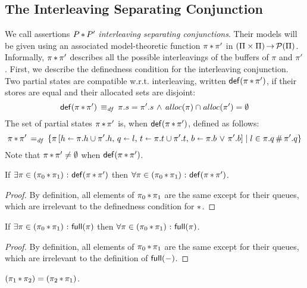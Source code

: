 \documentclass[11pt]{report}
\begin{document}
\subsection{The Interleaving Separating Conjunction}

We call assertions $P \operatorname{\ast} P'$ \emph{interleaving separating conjunctions}. Their models will be given using an associated model-theoretic function $\pi \operatorname{\ast} \pi'$ in $(\Pi \times \Pi) \operatorname{\rightarrow} \mathcal{P}(\Pi)$. Informally, $\pi \operatorname{\ast} \pi'$ describes all the possible interleavings of the buffers of $\pi$ and $\pi'$. First, we describe the definedness condition for the interleaving conjunction. Two partial states are compatible w.r.t. interleaving, written $\mathsf{def}(\pi \operatorname{\ast} \pi')$, if their stores are equal and  their allocated sets are disjoint: \[ \mathsf{def}(\pi \operatorname{\ast} \pi') \operatorname{\;\equiv_{\mathit{df}}\;} \pi.s = \pi'.s \operatorname{\,\wedge\,} \mathit{alloc}(\pi) \cap \mathit{alloc}(\pi') = \operatorname{\emptyset} \]
The set of partial states $\pi \operatorname{\ast} \pi'$ is, when $\mathsf{def}(\pi \operatorname{\ast} \pi')$, defined as follows:\[ 
	\pi \operatorname{\ast} \pi' \operatorname{\;=_{\mathit{df}}\;} \left\lbrace \pi \left[ h \shortleftarrow \pi.h \cup \pi'.h,\,q \shortleftarrow l,\, t \shortleftarrow \pi.t \cup \pi'.t,\,b \shortleftarrow \pi.b \operatorname{\,\vee\,} \pi'.b  \right] \mid l \in \pi.q \,\#\, \pi'.q \right\rbrace
\] Note that $\pi \operatorname{\ast} \pi' \neq \operatorname{\emptyset}$ when $\mathsf{def}(\pi \operatorname{\ast} \pi')$.

\begin{lemma}
	\label{lem:sep-def-uniform}
	If $\exists \pi \in (\pi_0 \operatorname{\ast} \pi_1) \operatorname{\,:\,} \mathsf{def}(\pi \operatorname{\ast} \pi')$ then $\forall \pi \in (\pi_0 \operatorname{\ast} \pi_1) \operatorname{\,:\,} \mathsf{def}(\pi \operatorname{\ast} \pi')$. 
\end{lemma}

\begin{proof}
	By definition, all elements of $\pi_0 \operatorname{\ast} \pi_1$ are the same except for their queues, which are irrelevant to the definedness condition for $\operatorname{\ast}$. 
\end{proof}

\begin{lemma}
	\label{lem:full-uniform}
	If $\exists \pi \in (\pi_0 \operatorname{\ast} \pi_1) \operatorname{\,:\,} \mathsf{full}(\pi)$ then $\forall \pi \in (\pi_0 \operatorname{\ast} \pi_1) \operatorname{\,:\,} \mathsf{full}(\pi)$. 
\end{lemma}

\begin{proof}
	By definition, all elements of $\pi_0 \operatorname{\ast} \pi_1$ are the same except for their queues, which are irrelevant to the definition of $\mathsf{full}(-)$. 
\end{proof}

\begin{lemma}[Commutativity]
	\label{lem:sep-comm}
	$(\pi_1 \operatorname{\ast} \pi_2) = (\pi_2 \operatorname{\ast} \pi_1)$. 
\end{lemma}
\end{document}
